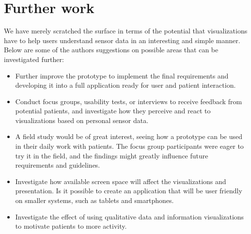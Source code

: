 \section{Further work}
We have merely scratched the surface in terms of the potential that visualizations have to help users understand sensor data in an interesting and simple manner. Below are some of the authors suggestions on possible areas that can be investigated further:

\begin{itemize}
  \item Further improve the  prototype to implement the final requirements and developing it into a full application ready for user and patient interaction.
  \item Conduct focus groups, usability tests, or interviews to receive feedback from potential patients, and investigate how they perceive and react to visualizations based on personal sensor data.
  \item A field study would be of great interest, seeing how a prototype can be used in their daily work with patients. The focus group participants were eager to try it in the field, and the findings might greatly influence future requirements and guidelines.
  \item Investigate how available screen space will affect the visualizations and presentation. Is it possible to create an application that will be user friendly on smaller systems, such as tablets and smartphones.
  \item Investigate the effect of using qualitative data and information visualizations to motivate patients to more activity.
\end{itemize}

